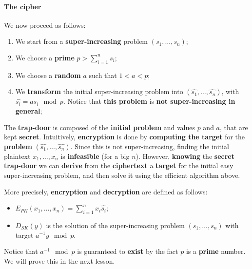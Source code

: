 

\paragraph{The cipher}
We now proceed as follows:

\begin{enumerate}
    \item We start from a \textbf{super-increasing} problem $(s_1,\ldots,s_n)$;
    \item We choose a \textbf{prime} $p > \sum_{i=1}^{n}{s_i}$;
    \item We choose a \textbf{random} $a$ such that $1 < a < p$;
    \item We \textbf{transform} the initial super-increasing problem into $(\hat{s_1}, \ldots, \hat{s_n})$, with $\hat{s_i} = a s_i \mod p$. Notice that \textbf{this problem} is \textbf{not super-increasing in general};
\end{enumerate}

The \textbf{trap-door} is composed of the \textbf{initial problem} and values $p$ and $a$, that are kept \textbf{secret}. Intuitively, \textbf{encryption} is done by \textbf{computing the target} for the \textbf{problem} $(\hat{s_1}, \ldots, \hat{s_n})$. Since this is not super-increasing, finding the initial plaintext $x_1, \ldots, x_n$ is \textbf{infeasible} (for a big $n$). However, \textbf{knowing} the \textbf{secret trap-door} we can \textbf{derive} from the \textbf{ciphertext} a \textbf{target} for the initial easy super-increasing problem, and then solve it using the efficient algorithm above. 

More precisely, \textbf{encryption} and \textbf{decryption} are defined as follows:

\begin{itemize}
    \item $E_{PK}(x_1, \ldots, x_n) = \sum_{i=1}^{n}{x_i \hat{s_i}}$;
    \item $D_{SK}(y)$ is the solution of the super-increasing problem $(s_1,\ldots,s_n)$ with target $a^{-1} y \mod p$.
\end{itemize}

Notice that $a^{-1} \mod p$ is guaranteed to \textbf{exist} by the fact $p$ is a \textbf{prime} number. We will prove this in the next lesson. 

